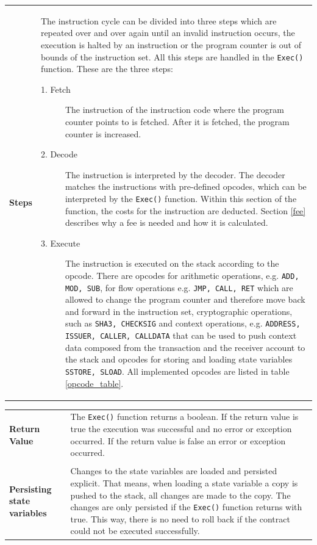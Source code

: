 \begin{tabular}[t]{ p{3cm} p{12.5cm}}
\textbf{Steps} &
The instruction cycle can be divided into three steps which are repeated over and over again until an invalid instruction occurs, the execution is halted by an instruction or the program counter is out of bounds of the instruction set. All this steps are handled in the \texttt{Exec()} function. These are the three steps:
\begin{description}
  \item[1. Fetch] The instruction of the instruction code where the program counter points to is fetched. After it is fetched, the program counter is increased.
  \item[2. Decode] The instruction is interpreted by the decoder. The decoder matches the instructions with pre-defined opcodes, which can be interpreted by the \texttt{Exec()} function. Within this section of the function, the costs for the instruction are deducted. Section \ref{fee} describes why a fee is needed and how it is calculated.
    \item[3. Execute] The instruction is executed on the stack according to the opcode. There are opcodes for arithmetic operations, e.g. \texttt{ADD, MOD, SUB}, for flow operations e.g. \texttt{JMP, CALL, RET} which are allowed to change the program counter and therefore move back and forward in the instruction set, cryptographic operations, such as \texttt{SHA3, CHECKSIG} and context operations, e.g. \texttt{ADDRESS, ISSUER, CALLER, CALLDATA} that can be used to push context data composed from the transaction and the receiver account to the stack and opcodes for storing and loading state variables \texttt{SSTORE, SLOAD}. All implemented opcodes are listed in table \ref{opcode_table}.
    \end{description}    
\end{tabular}

\begin{tabular}[t]{ p{3cm} p{12.5cm}}
\raggedright
\textbf{Return Value} &
The \texttt{Exec()} function returns a boolean. If the return value is true the execution was successful and no error or exception occurred. If the return value is false an error or exception occurred. \\ \\

\textbf{Persisting state variables} &
Changes to the state variables are loaded and persisted explicit. That means, when loading a state variable a copy is pushed to the stack, all changes are made to the copy. The changes are only persisted if the \texttt{Exec()} function returns with true. This way, there is no need to roll back if the contract could not be executed successfully.
\end{tabular}

